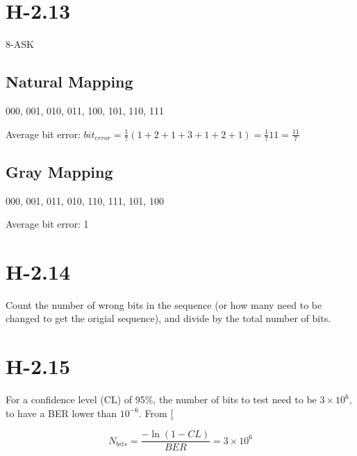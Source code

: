 \documentclass{article}
\begin{document}
\section{H-2.13}
8-ASK

\subsection{Natural Mapping}

000, 001, 010, 011, 100, 101, 110, 111

Average bit error: $bit_{error} = \frac{1}{7} (1+2+1+3+1+2+1) = \frac{1}{7} 11 = \frac{11}{7}$

\subsection{Gray Mapping}

000, 001, 011, 010, 110, 111, 101, 100

Average bit error: 1

\section{H-2.14}

Count the number of wrong bits in the sequence (or how many need to be changed to get the origial sequence), and divide by the total number of bits.

\section{H-2.15}

For a confidence level (CL) of 95\%, the number of bits to test need to be $3 \times 10^6$, to have a BER lower than $10^{-6}$.
From \href{https://edadocs.software.keysight.com/kkbopen/how-do-i-measure-the-bit-error-rate-ber-to-a-given-confidence-level-on-the-j-bert-m8020a-and-the-m8040a-high-performance-bert-588276182.html}[

\begin{equation}
    N_{bits} = \frac{-\ln(1-CL)}{BER} = 3 \times 10^6
\end{equation}
\end{document}
